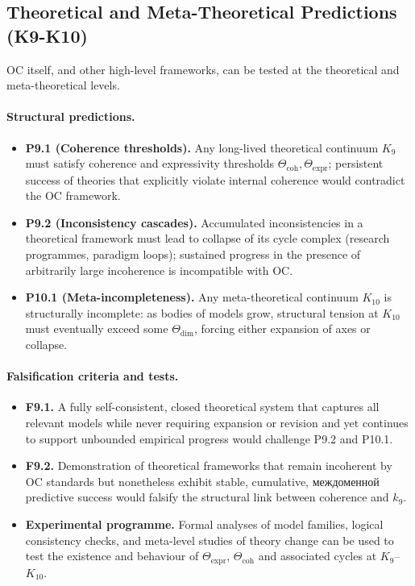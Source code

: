 \subsection{Theoretical and Meta-Theoretical Predictions (K9-K10)}

OC itself, and other high-level frameworks, can be tested at the theoretical
and meta-theoretical levels.

\paragraph{Structural predictions.}
\begin{itemize}
  \item \textbf{P9.1 (Coherence thresholds).}
        Any long-lived theoretical continuum \(K_9\) must satisfy coherence
        and expressivity thresholds
        \(\Theta_{\mathrm{coh}}, \Theta_{\mathrm{expr}}\); persistent
        success of theories that explicitly violate internal coherence
        would contradict the OC framework.
  \item \textbf{P9.2 (Inconsistency cascades).}
        Accumulated inconsistencies in a theoretical framework must lead to
        collapse of its cycle complex (research programmes, paradigm loops);
        sustained progress in the presence of arbitrarily large incoherence
        is incompatible with OC.
  \item \textbf{P10.1 (Meta-incompleteness).}
        Any meta-theoretical continuum \(K_{10}\) is structurally incomplete:
        as bodies of models grow, structural tension at \(K_{10}\) must
        eventually exceed some \(\Theta_{\mathrm{dim}}\), forcing either
        expansion of axes or collapse.
\end{itemize}

\paragraph{Falsification criteria and tests.}
\begin{itemize}
  \item \textbf{F9.1.}
        A fully self-consistent, closed theoretical system that captures
        all relevant models while never requiring expansion or revision and
        yet continues to support unbounded empirical progress would
        challenge P9.2 and P10.1.
  \item \textbf{F9.2.}
        Demonstration of theoretical frameworks that remain incoherent
        by OC standards but nonetheless exhibit stable, cumulative,
        междоменной predictive success would falsify the structural link
        between coherence and \(k_9\).
  \item \textbf{Experimental programme.}
        Formal analyses of model families, logical consistency checks,
        and meta-level studies of theory change can be used to test the
        existence and behaviour of \(\Theta_{\mathrm{expr}}\),
        \(\Theta_{\mathrm{coh}}\) and associated cycles at \(K_9\)–\(K_{10}\).
\end{itemize}


